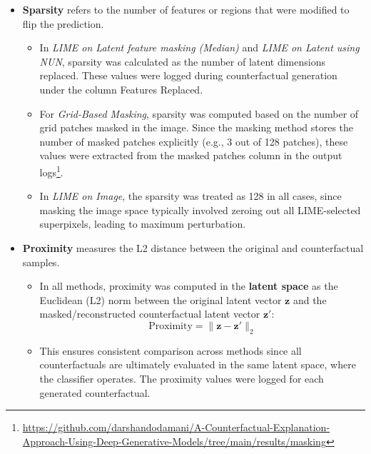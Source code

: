\begin{itemize}
    \item \textbf{Sparsity} refers to the number of features or regions that were modified to flip the prediction. 
    \begin{itemize}
        \item In \textit{LIME on Latent feature masking (Median)} and \textit{LIME on Latent using NUN}, sparsity was calculated as the number of latent dimensions replaced. These values were logged during counterfactual generation under the column Features Replaced.
        \item For \textit{Grid-Based Masking}, sparsity was computed based on the number of grid patches masked in the image. Since the masking method stores the number of masked patches explicitly (e.g., 3 out of 128 patches), these values were extracted from the masked patches column in the output logs\footnote{\url{https://github.com/darshandodamani/A-Counterfactual-Explanation-Approach-Using-Deep-Generative-Models/tree/main/results/masking}}.
        \item In \textit{LIME on Image}, the sparsity was treated as 128 in all cases, since masking the image space typically involved zeroing out all LIME-selected superpixels, leading to maximum perturbation.
    \end{itemize}
    
    \item \textbf{Proximity} measures the L2 distance between the original and counterfactual samples. 
    \begin{itemize}
        \item In all methods, proximity was computed in the \textbf{latent space} as the Euclidean (L2) norm between the original latent vector $\mathbf{z}$ and the masked/reconstructed counterfactual latent vector $\mathbf{z'}$:
        \[
        \text{Proximity} = \|\mathbf{z} - \mathbf{z'}\|_2
        \]
        \item This ensures consistent comparison across methods since all counterfactuals are ultimately evaluated in the same latent space, where the classifier operates. The proximity values were logged for each generated counterfactual.
    \end{itemize}
\end{itemize}

